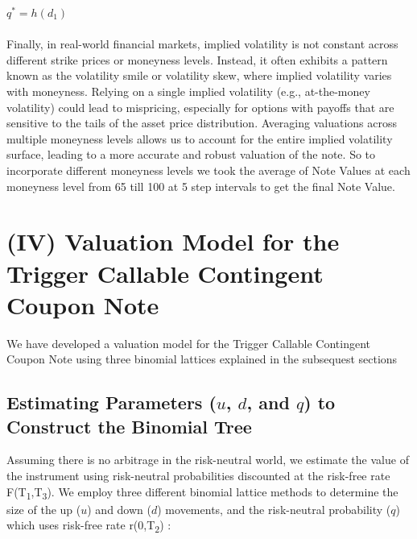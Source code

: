 \documentclass[12pt,a4paper]{article}
\begin{document}
$q^* = h(d_1)$\\\\

Finally, in real-world financial markets, implied volatility is not constant across different strike prices or moneyness levels. Instead, it often exhibits a pattern known as the volatility smile or volatility skew, where implied volatility varies with moneyness.  Relying on a single implied volatility (e.g., at-the-money volatility) could lead to mispricing, especially for options with payoffs that are sensitive to the tails of the asset price distribution. Averaging valuations across multiple moneyness levels allows us to account for the entire implied volatility surface, leading to a more accurate and robust valuation of the note. So to incorporate different moneyness levels we took the average of Note Values at each moneyness level from 65 till 100 at 5 step intervals to get the final Note Value.

\section*{(IV) Valuation Model for the Trigger Callable Contingent Coupon Note}

We have developed a valuation model for the Trigger Callable Contingent Coupon Note using three binomial lattices explained in the subsequest sections

\subsection*{Estimating Parameters (\( u \), \( d \), and \( q \)) to Construct the Binomial Tree}

Assuming there is no arbitrage in the risk-neutral world, we estimate the value of the instrument using risk-neutral probabilities discounted at the risk-free rate F(T\textsubscript{1},T\textsubscript{3}). We employ three different binomial lattice methods to determine the size of the up (\( u \)) and down (\( d \)) movements, and the risk-neutral probability (\( q \)) which uses risk-free rate r(0,T\textsubscript{2}) :
\end{document}
